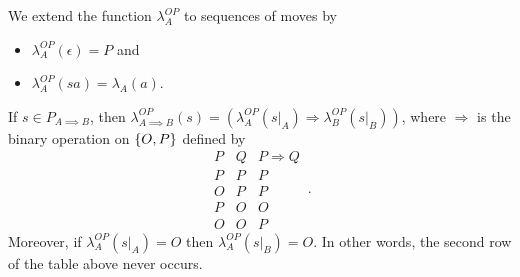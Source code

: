 \begin{lemma}
  We extend the function $\lambda_A^{OP}$ to sequences of moves by
  \begin{itemize}
    \item $\lambda_A^{OP}(\epsilon)=P$ and
    \item $\lambda_A^{OP}(sa)=\lambda_A(a)$.
  \end{itemize}

  If $s\in P_{A\implies B}$, then $\lambda_{A\implies B}^{OP}(s)=(\lambda_A^{OP}(s\vert_A)\Rightarrow \lambda_B^{OP}(s\vert_B))$, where $\Rightarrow$ is the binary operation on $\{O,P\}$ defined by
  \[
    \begin{array}{cc|c}
      P & Q & P\Rightarrow Q \\
      \hline
      P & P & P \\
      O & P & P \\
      P & O & O \\
      O & O & P
    \end{array}\,.
    \]
  Moreover, if $\lambda_A^{OP}(s\vert_A)=O$ then $\lambda_A^{OP}(s\vert_B)=O$.
  In other words, the second row of the table above never occurs.
  \label{LemCompositionLemma}
\end{lemma}
